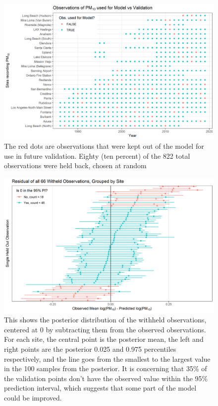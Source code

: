 \documentclass{article}
\begin{document}
\begin{figure}[ht]
    \centering
    \includegraphics[width = \textwidth]{Figures/Validation/validate_dotplot.png}
    \caption{The red dots are observations that were kept out of the model for use in future validation.  Eighty (ten percent) of the 822 total observations were held back, chosen at random}
    \label{fig:validate_dotplot}
\end{figure}

\begin{figure}[ht]
    \centering
    \includegraphics[width = \textwidth]{Figures/Validation/validate_delta_mean.png}
    \caption{This shows the posterior distribution of the withheld observations, centered at 0 by subtracting them from the observed observations.  For each site, the central point is the posterior mean, the left and right points are the posterior 0.025 and 0.975 percentiles respectively, and the line goes from the smallest to the largest value in the 100 samples from the posterior.  It is concerning that 35\% of the validation points don't have the observed value within the 95\% prediction interval, which suggests that some part of the model could be improved.}
    \label{fig:validate_delta_mean}
\end{figure}
\end{document}

